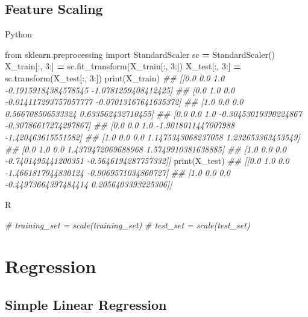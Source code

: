 \documentclass[
]{book}
\newenvironment{Shaded}{\begin{snugshade}}{\end{snugshade}}
\newcommand{\BuiltInTok}[1]{#1}
\newcommand{\CommentTok}[1]{\textcolor[rgb]{0.56,0.35,0.01}{\textit{#1}}}
\newcommand{\DecValTok}[1]{\textcolor[rgb]{0.00,0.00,0.81}{#1}}
\newcommand{\ImportTok}[1]{#1}
\newcommand{\NormalTok}[1]{#1}
\newcommand{\OperatorTok}[1]{\textcolor[rgb]{0.81,0.36,0.00}{\textbf{#1}}}
\theoremstyle{definition}
\theoremstyle{definition}
\theoremstyle{definition}
\theoremstyle{definition}
\theoremstyle{remark}
\begin{document}
\hypertarget{feature-scaling}{%
\section{Feature Scaling}\label{feature-scaling}}

Python

\begin{Shaded}
\begin{Highlighting}[]
\ImportTok{from}\NormalTok{ sklearn.preprocessing }\ImportTok{import}\NormalTok{ StandardScaler}
\NormalTok{sc }\OperatorTok{=}\NormalTok{ StandardScaler()}
\NormalTok{X\_train[:, }\DecValTok{3}\NormalTok{:] }\OperatorTok{=}\NormalTok{ sc.fit\_transform(X\_train[:, }\DecValTok{3}\NormalTok{:])}
\NormalTok{X\_test[:, }\DecValTok{3}\NormalTok{:] }\OperatorTok{=}\NormalTok{ sc.transform(X\_test[:, }\DecValTok{3}\NormalTok{:])}
\BuiltInTok{print}\NormalTok{(X\_train)}
\CommentTok{\#\# [[0.0 0.0 1.0 {-}0.19159184384578545 {-}1.0781259408412425]}
\CommentTok{\#\#  [0.0 1.0 0.0 {-}0.014117293757057777 {-}0.07013167641635372]}
\CommentTok{\#\#  [1.0 0.0 0.0 0.566708506533324 0.633562432710455]}
\CommentTok{\#\#  [0.0 0.0 1.0 {-}0.30453019390224867 {-}0.30786617274297867]}
\CommentTok{\#\#  [0.0 0.0 1.0 {-}1.9018011447007988 {-}1.420463615551582]}
\CommentTok{\#\#  [1.0 0.0 0.0 1.1475343068237058 1.232653363453549]}
\CommentTok{\#\#  [0.0 1.0 0.0 1.4379472069688968 1.5749910381638885]}
\CommentTok{\#\#  [1.0 0.0 0.0 {-}0.7401495441200351 {-}0.5646194287757332]]}
\BuiltInTok{print}\NormalTok{(X\_test)}
\CommentTok{\#\# [[0.0 1.0 0.0 {-}1.4661817944830124 {-}0.9069571034860727]}
\CommentTok{\#\#  [1.0 0.0 0.0 {-}0.44973664397484414 0.2056403393225306]]}
\end{Highlighting}
\end{Shaded}

R

\begin{Shaded}
\begin{Highlighting}[]
\CommentTok{\# training\_set = scale(training\_set)}
\CommentTok{\# test\_set = scale(test\_set)}
\end{Highlighting}
\end{Shaded}

\hypertarget{regression}{%
\chapter{Regression}\label{regression}}

\hypertarget{simple-linear-regression}{%
\section{Simple Linear Regression}\label{simple-linear-regression}}
\end{document}
